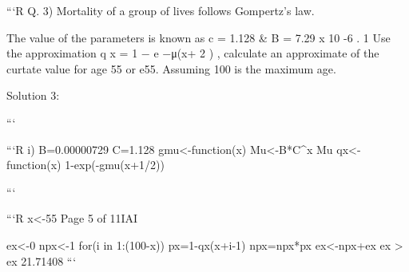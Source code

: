\documentclass[a4paper,12pt]{article}
\begin{document}
```R
Q. 3)
Mortality of a group of lives follows Gompertz’s law. 

The value of the parameters is known as c = 1.128 & B = 7.29 x 10 -6 .
1
Use the approximation q x = 1 − e −μ(x+ 2 ) , calculate an approximate of the curtate value
for age 55 or e55. Assuming 100 is the maximum age.

Solution 3:


```


```R
i)
B=0.00000729
C=1.128
gmu<-function(x){
Mu<-B*C^x
Mu
}
qx<-function(x){
1-exp(-gmu(x+1/2))
}



```


```R
x<-55
Page 5 of 11IAI

ex<-0
npx<-1
for(i in 1:(100-x)){
px=1-qx(x+i-1)
npx=npx*px
ex<-npx+ex}
ex
> ex
 21.71408
```
\end{document}
